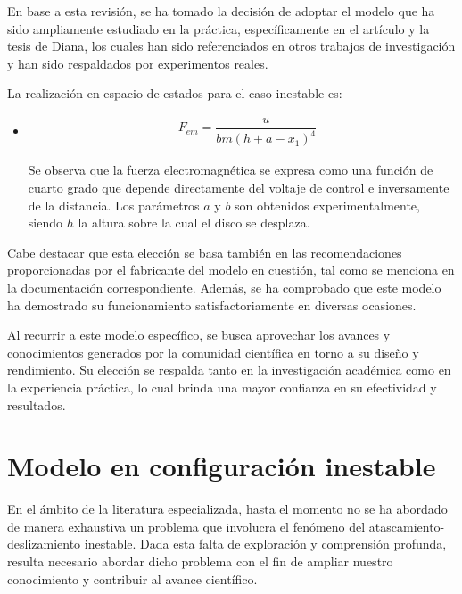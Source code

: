 





En base a esta revisión, se ha tomado la decisión de adoptar el modelo que ha sido ampliamente estudiado en la práctica, específicamente en el artículo y la tesis de Diana, los cuales han sido referenciados en otros trabajos de investigación y han sido respaldados por experimentos reales.

La realización en espacio de estados para el caso inestable es:

\begin{itemize}[label={}]
    \item{
    
    \begin{align*}
        &F_{em}= \dfrac{u}{bm(h+a-x_{1})^4} 
    \end{align*}
    
    
    Se observa que la fuerza electromagnética se expresa como una función de cuarto grado que depende directamente del voltaje de control  e inversamente de la distancia. Los parámetros $a$ y $b$ son obtenidos experimentalmente, siendo $h$ la altura sobre la cual el disco se desplaza.
    }
    
\end{itemize}

Cabe destacar que esta elección se basa también en las recomendaciones proporcionadas por el fabricante del modelo en cuestión, tal como se menciona en la documentación correspondiente. Además, se ha comprobado que este modelo ha demostrado su funcionamiento satisfactoriamente en diversas ocasiones.

Al recurrir a este modelo específico, se busca aprovechar los avances y conocimientos generados por la comunidad científica en torno a su diseño y rendimiento. Su elección se respalda tanto en la investigación académica como en la experiencia práctica, lo cual brinda una mayor confianza en su efectividad y resultados.

\section{Modelo en configuración inestable}

En el ámbito de la literatura especializada, hasta el momento no se ha abordado de manera exhaustiva un problema que involucra el fenómeno del atascamiento-deslizamiento inestable. Dada esta falta de exploración y comprensión profunda, resulta necesario abordar dicho problema con el fin de ampliar nuestro conocimiento y contribuir al avance científico.

